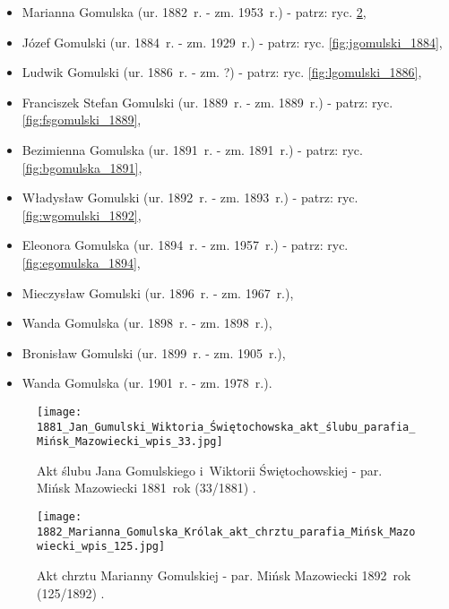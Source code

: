 \begin{itemize}
    \item Marianna Gomulska (ur. 1882~r. - zm. 1953~r.) - patrz: ryc. 
    \ref{fig:mgomulska_1882},
    \item Józef Gomulski (ur. 1884~r. - zm. 1929~r.) - patrz: ryc. 
    \ref{fig:jgomulski_1884},
    \item Ludwik Gomulski (ur. 1886~r. - zm. ?) - patrz: ryc. 
    \ref{fig:lgomulski_1886},
    \item Franciszek Stefan Gomulski (ur. 1889~r. - zm. 1889~r.) - patrz: ryc. 
    \ref{fig:fsgomulski_1889},
    \item Bezimienna Gomulska (ur. 1891~r. - zm. 1891~r.) - patrz: ryc. 
    \ref{fig:bgomulska_1891},
    \item Władysław Gomulski (ur. 1892~r. - zm. 1893~r.) - patrz: ryc. 
    \ref{fig:wgomulski_1892},
    \item Eleonora Gomulska (ur. 1894~r. - zm. 1957~r.) - patrz: ryc. 
    \ref{fig:egomulska_1894},
    \item Mieczysław Gomulski (ur. 1896~r. - zm. 1967~r.),
    \item Wanda Gomulska (ur. 1898~r. - zm. 1898~r.),
    \item Bronisław Gomulski (ur. 1899~r. - zm. 1905~r.),
    \item Wanda Gomulska (ur. 1901~r. - zm. 1978~r.).
  \end{itemize}

  \begin{figure}[!ht]
    \vspace*{0.5cm}
    \centering \texttt{[image: 
        1881\_Jan\_Gumulski\_Wiktoria\_Świętochowska\_akt\_ślubu\_parafia\_Mińsk\_Mazowiecki\_wpis\_33.jpg]}
    \captionsetup{format=hang}
    \caption{Akt ślubu Jana Gomulskiego i~Wiktorii Świętochowskiej - par. 
    Mińsk Mazowiecki 1881~rok (33/1881) \cite{par_minsk2}.}
    \label{fig:jgomulski_1881}
\end{figure}

\begin{figure}[!ht]
    \vspace*{0.5cm}
    \centering \texttt{[image: 
        1882\_Marianna\_Gomulska\_Królak\_akt\_chrztu\_parafia\_Mińsk\_Mazowiecki\_wpis\_125.jpg]}
    \captionsetup{format=hang}
    \caption{Akt chrztu Marianny Gomulskiej - par. Mińsk Mazowiecki
    1892~rok (125/1892) 
    \cite{par_minsk2}.}
    \label{fig:mgomulska_1882}
\end{figure}

